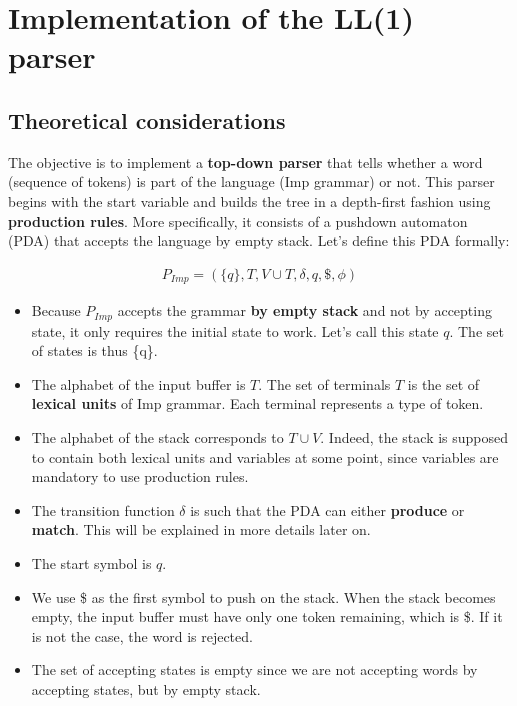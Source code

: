 \chapter{Implementation of the LL(1) parser}

\section{Theoretical considerations}

The objective is to implement a \textbf{top-down parser} that tells whether a word (sequence of tokens)
is part of the language (Imp grammar) or not. This parser begins with the start variable and builds the
tree in a depth-first fashion using \textbf{production rules}. More specifically, it consists of a pushdown
automaton (PDA) that accepts the language by empty stack. Let's define this PDA formally:

\begin{equation}
  \begin{split}
    P_{Imp} = (\{q\}, T, V \cup T, \delta, q, \$, \phi)
   \end{split}
\end{equation}

\begin{itemize}
  \item Because $P_{Imp}$ accepts the grammar \textbf{by empty stack} and not by accepting state, it only requires the initial state to work. 
        Let's call this state $q$. The set of states is thus \{q\}.
  \item The alphabet of the input buffer is $T$. The set of terminals $T$ is the set of \textbf{lexical units} of Imp grammar. 
        Each terminal represents a type of token.
  \item The alphabet of the stack corresponds to $T \cup V$. Indeed, the stack is supposed to contain both lexical units and variables
        at some point, since variables are mandatory to use production rules.
  \item The transition function $\delta$ is such that the PDA can either \textbf{produce} or \textbf{match}. This will be explained
        in more details later on.
  \item The start symbol is $q$.
  \item We use \$ as the first symbol to push on the stack. When the stack becomes empty, the input buffer must have only one token
        remaining, which is \$. If it is not the case, the word is rejected.
  \item The set of accepting states is empty since we are not accepting words by accepting states, but by empty stack.
\end{itemize}

